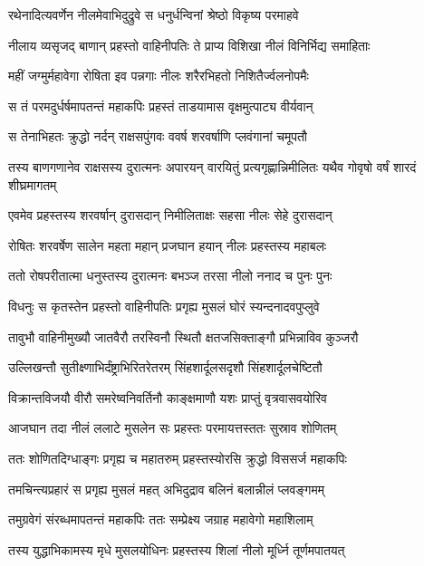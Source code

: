 \twolineshloka
{रथेनादित्यवर्णेन नीलमेवाभिदुद्रुवे}
{स धनुर्धन्विनां श्रेष्ठो विकृष्य परमाहवे} %

\twolineshloka
{नीलाय व्यसृजद् बाणान् प्रहस्तो वाहिनीपतिः}
{ते प्राप्य विशिखा नीलं विनिर्भिद्य समाहिताः} %

\twolineshloka
{महीं जग्मुर्महावेगा रोषिता इव पन्नगाः}
{नीलः शरैरभिहतो निशितैर्ज्वलनोपमैः} %

\twolineshloka
{स तं परमदुर्धर्षमापतन्तं महाकपिः}
{प्रहस्तं ताडयामास वृक्षमुत्पाट्य वीर्यवान्} %

\twolineshloka
{स तेनाभिहतः क्रुद्धो नर्दन् राक्षसपुंगवः}
{ववर्ष शरवर्षाणि प्लवंगानां चमूपतौ} %

\threelineshloka
{तस्य बाणगणानेव राक्षसस्य दुरात्मनः}
{अपारयन् वारयितुं प्रत्यगृह्णान्निमीलितः}
{यथैव गोवृषो वर्षं शारदं शीघ्रमागतम्} %

\twolineshloka
{एवमेव प्रहस्तस्य शरवर्षान् दुरासदान्}
{निमीलिताक्षः सहसा नीलः सेहे दुरासदान्} %

\twolineshloka
{रोषितः शरवर्षेण सालेन महता महान्}
{प्रजघान हयान् नीलः प्रहस्तस्य महाबलः} %

\twolineshloka
{ततो रोषपरीतात्मा धनुस्तस्य दुरात्मनः}
{बभञ्ज तरसा नीलो ननाद च पुनः पुनः} %

\twolineshloka
{विधनुः स कृतस्तेन प्रहस्तो वाहिनीपतिः}
{प्रगृह्य मुसलं घोरं स्यन्दनादवपुप्लुवे} %

\twolineshloka
{तावुभौ वाहिनीमुख्यौ जातवैरौ तरस्विनौ}
{स्थितौ क्षतजसिक्ताङ्गौ प्रभिन्नाविव कुञ्जरौ} %

\twolineshloka
{उल्लिखन्तौ सुतीक्ष्णाभिर्दंष्ट्राभिरितरेतरम्}
{सिंहशार्दूलसदृशौ सिंहशार्दूलचेष्टितौ} %

\twolineshloka
{विक्रान्तविजयौ वीरौ समरेष्वनिवर्तिनौ}
{काङ्क्षमाणौ यशः प्राप्तुं वृत्रवासवयोरिव} %

\twolineshloka
{आजघान तदा नीलं ललाटे मुसलेन सः}
{प्रहस्तः परमायत्तस्ततः सुस्राव शोणितम्} %

\twolineshloka
{ततः शोणितदिग्धाङ्गः प्रगृह्य च महातरुम्}
{प्रहस्तस्योरसि क्रुद्धो विससर्ज महाकपिः} %

\twolineshloka
{तमचिन्त्यप्रहारं स प्रगृह्य मुसलं महत्}
{अभिदुद्राव बलिनं बलान्नीलं प्लवङ्गमम्} %

\twolineshloka
{तमुग्रवेगं संरब्धमापतन्तं महाकपिः}
{ततः सम्प्रेक्ष्य जग्राह महावेगो महाशिलाम्} %

\twolineshloka
{तस्य युद्धाभिकामस्य मृधे मुसलयोधिनः}
{प्रहस्तस्य शिलां नीलो मूर्ध्नि तूर्णमपातयत्} %

